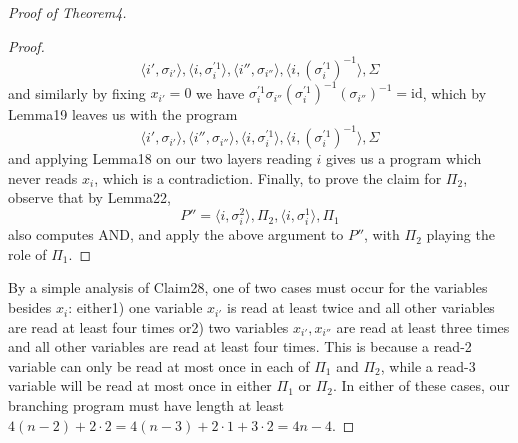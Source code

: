 \documentclass[10pt,a4paper]{article}
\begin{document}
\begin{proof}[Proof of Theorem4]
\begin{proof}
\[\langle i',\sigma_{i'}\rangle,\langle i,\sigma_i^{\prime1}\rangle,\langle i'',\sigma_{i''}\rangle,\langle i,(\sigma_i^{\prime1})^{-1}\rangle,\Sigma\]
and similarly by fixing $x_{i'}=0$ we have $\sigma_i^{\prime1}\sigma_{i''}(\sigma_i^{\prime1})^{-1}(\sigma_{i''})^{-1}=\mathrm{id}$, which by Lemma19 leaves us with the program
\[\langle i',\sigma_{i'}\rangle,\langle i'',\sigma_{i''}\rangle,\langle i,\sigma_i^{\prime1}\rangle,\langle i,(\sigma_i^{\prime1})^{-1}\rangle,\Sigma\]
and applying Lemma18 on our two layers reading $i$ gives us a program which never reads $x_i$, which is a contradiction.
Finally, to prove the claim for $\Pi_2$, observe that by Lemma22,
\[P''=\langle i,\sigma_i^2\rangle,\Pi_2,\langle i,\sigma_i^1\rangle,\Pi_1\]
also computes AND, and apply the above argument to $P''$, with $\Pi_2$ playing the role of $\Pi_1$.
\end{proof}
By a simple analysis of Claim28, one of two cases must occur for the variables besides $x_i$: either1) one variable $x_{i'}$ is read at least twice and all other variables are read at least four times or2) two variables $x_{i'},x_{i''}$ are read at least three times and all other variables are read at least four times. This is because a read-2 variable can only be read at most once in each of $\Pi_1$ and $\Pi_2$, while a read-3 variable will be read at most once in either $\Pi_1$ or $\Pi_2$. In either of these cases, our branching program must have length at least $4(n-2)+2\cdot2=4(n-3)+2\cdot1+3\cdot2=4n-4$.
\end{proof}
\end{document}
